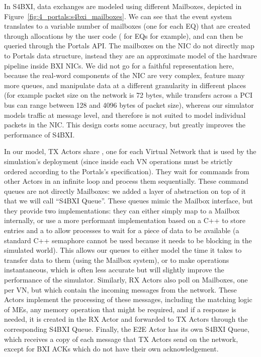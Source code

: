 In S4BXI, data exchanges are modeled using different Mailboxes, depicted in
Figure~\ref{fig:4_portals:s4bxi_mailboxes}. We can see that the event system
translates to a variable number of mailboxes (one for each EQ) that are created
through allocations by the user code ( for EQs for example),
and can then be queried through the Portals API. The mailboxes on the NIC do not
directly map to Portals data structure, instead they are an approximate model of
the hardware pipeline inside BXI NICs. We did not go for a faithful
representation here, because the real-word components of the NIC are very
complex, feature many more queues, and manipulate data at a different
granularity in different places (for example packet size on the network is 72
bytes, while transfers across a PCI bus can range between 128 and 4096 bytes of
packet size), whereas our simulator models traffic at message level, and
therefore is not suited to model individual packets in the NIC. This design
costs some accuracy, but greatly improves the performance of S4BXI.

In our model, TX Actors share , one for each
Virtual Network that is used by the simulation's deployment (since inside each
VN operations must be strictly ordered according to the Portals's
specification). They wait for commands from other Actors in an infinite loop and
process them sequentially. These command queues are not directly Mailboxes: we
added a layer of abstraction on top of it that we will call ``S4BXI Queue''.
These queues mimic the Mailbox interface, but they provide two implementations:
they can either simply map to a Mailbox internally, or use a more performant
implementation based on a C++  to store entries and a
 to allow processes to wait for a piece of data
to be available (a standard C++ semaphore cannot be used because it needs to be
blocking in the simulated world). This allows our queues to either model the
time it takes to transfer data to them (using the Mailbox system), or to make
operations instantaneous, which is often less accurate but will slightly improve
the performance of the simulator. Similarly, RX Actors also poll on Mailboxes,
one per VN, but which contain the incoming messages from the network. These
Actors implement the processing of these messages, including the matching logic
of MEs, any memory operation that might be required, and if a response is
needed, it is created in the RX Actor and forwarded to TX Actors through the
corresponding S4BXI Queue. Finally, the E2E Actor has its own S4BXI Queue, which
receives a copy of each message that TX Actors send on the network, except for
BXI ACKs which do not have their own acknowledgement.

